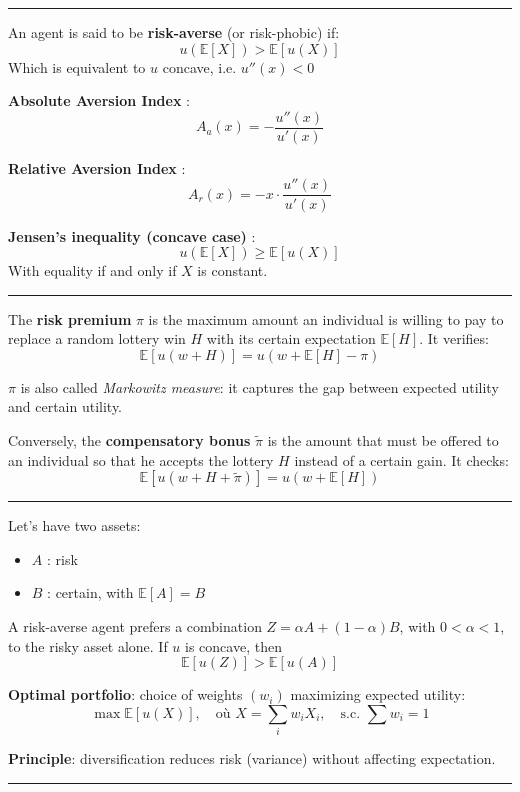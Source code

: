 \hrule

\begin{f}
	An agent is said to be \textbf{risk-averse} (or risk-phobic) if:
	\[
	u(\mathbb{E}[X]) > \mathbb{E}[u(X)]
	\]
	Which is equivalent to \(u\) concave, i.e. \(u''(x) < 0\)
\end{f}

\begin{f}
	\textbf{Absolute Aversion Index} :
	\[
	A_a(x) = -\frac{u''(x)}{u'(x)}
	\]
	
	\textbf{Relative Aversion Index} :
	\[
	A_r(x) = -x \cdot \frac{u''(x)}{u'(x)}
	\]
	
	\textbf{Jensen's inequality (concave case)} :
	\[
	u(\mathbb{E}[X]) \geq \mathbb{E}[u(X)]
	\]
With equality if and only if \(X\) is constant.
\end{f}
\hrule


\begin{f}
	
The \textbf{risk premium} \(\pi\) is the maximum amount an individual is willing to pay to replace a random lottery win \(H\) with its certain expectation \(\mathbb{E}[H]\). It verifies:
\[
\mathbb{E}[u(w + H)] = u(w + \mathbb{E}[H] - \pi)
\]


\(\pi\) is also called \emph{Markowitz measure}: it captures the gap between expected utility and certain utility.

Conversely, the \textbf{compensatory bonus} \(\tilde{\pi}\) is the amount that must be offered to an individual so that he accepts the lottery \(H\) instead of a certain gain. It checks:
\[
\mathbb{E}[u(w + H + \tilde{\pi})] = u(w + \mathbb{E}[H])
\]

\end{f}
\hrule
\begin{f}
	
	Let's have two assets:
	\begin{itemize}
		\item \(A\) : risk
		\item \(B\) : certain, with \(\mathbb{E}[A] = B\)
	\end{itemize}
	
	A risk-averse agent prefers a combination \(Z = \alpha A + (1 - \alpha) B\), with \(0 < \alpha < 1\), to the risky asset alone.
	If $u$ is concave, then
	\[
	\mathbb{E}[u(Z)] > \mathbb{E}[u(A)]
	\]
	
	\textbf{Optimal portfolio}: choice of weights \((w_i)\) maximizing expected utility:
	\[
	\max \mathbb{E}[u(X)], \quad \text{où } X = \sum_{i} w_i X_i, \quad \text{s.c. } \sum w_i = 1
	\]
	
	\textbf{Principle}: diversification reduces risk (variance) without affecting expectation.
	
	
\end{f}
\hrule

